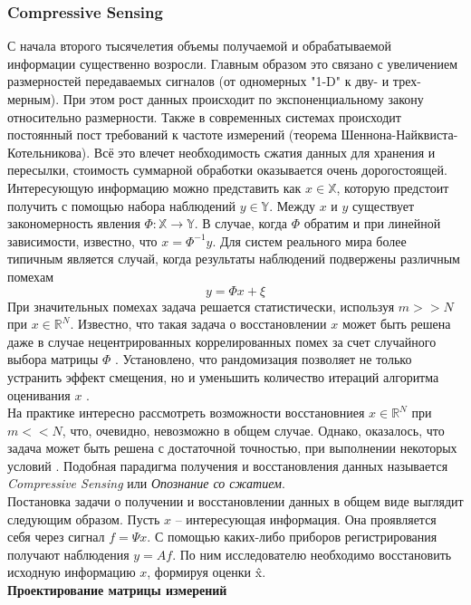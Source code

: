 \documentclass[14pt]{matmex-diploma}
\begin{document}
\subsubsection{Compressive Sensing}
С начала второго тысячелетия объемы получаемой и обрабатываемой информации существенно возросли. Главным образом это связано с увеличением размерностей передаваемых сигналов (от одномерных "1-D" к дву- и  трех- мерным). При этом рост данных происходит по экспоненциальному закону относительно размерности. Также в современных системах происходит постоянный пост требований к частоте измерений (теорема Шеннона-Найквиста-Котельникова). Всё это влечет необходимость сжатия данных для хранения и пересылки, стоимость суммарной обработки оказывается очень дорогостоящей.
Интересующую информацию можно представить как $x \in \mathbb{X}$, которую предстоит получить с помощью набора наблюдений $y \in \mathbb{Y}$. Между $x$ и $y$ существует закономерность явления $\Phi:\mathbb{X}\to\mathbb{Y}$. В случае, когда $\Phi$ обратим и при линейной зависимости, известно, что $x = \Phi^{-1}y $. Для систем реального мира более типичным является случай, когда результаты наблюдений подвержены различным помехам \[y = \Phi x + \xi\] 
При значительных помехах задача решается статистически, используя $m >> N$ при $x \in \mathbb{R}^N$. Известно, что такая задача о восстановлении $x$ может быть решена даже в случае нецентрированных коррелированных помех за счет случайного выбора матрицы $\Phi$ \cite{granichin2004linear}. Установлено, что рандомизация позволяет не только устранить эффект смещения, но и уменьшить количество итераций алгоритма оценивания $x$ \cite{граничин2003рандомизированные}. \\
На практике интересно рассмотреть возможности восстановниея $x \in \mathbb{R}^N$ при $m << N$, что, очевидно, невозможно в общем случае. Однако, оказалось, что задача может быть решена с достаточной точностью, при выполнении некоторых условий \cite{donoho2006compressed}. Подобная парадигма получения и восстановления данных называется \textit{Compressive Sensing} или \textit{Опознание со сжатием}. \\
Постановка задачи о получении и восстановлении данных в общем виде выглядит следующим образом. Пусть $x$ -- интересующая информация. Она проявляется себя через сигнал $f = \Psi x$. С помощью каких-либо приборов регистрирования получают наблюдения $y = A f$. По ним исследователю необходимо восстановить исходную информацию $x$, формируя оценки \^{x}. \\
\textbf{Проектирование матрицы измерений}\\
\end{document}
